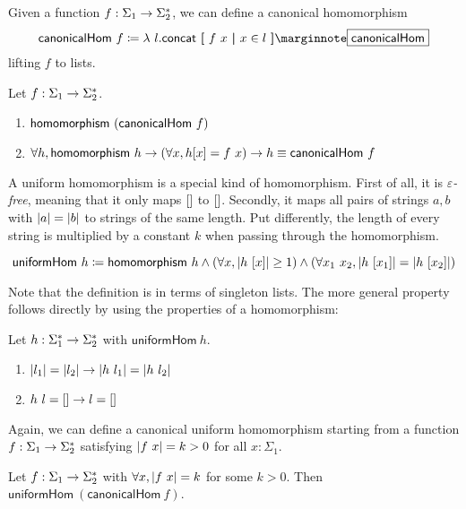 \newcommand{\canonicalHom}{\textsf{canonicalHom}}
Given a function $f : \Sigma_1 \rightarrow \Sigma_2^*$, we can define a canonical homomorphism \[\canonicalHom~f \defeq \lambda~l. \rconcat~\withl f~x \withm x \in l \withr \mnote{\canonicalHom}\]  lifting $f$ to lists.

\begin{proposition}
  Let $f : \Sigma_1 \rightarrow \Sigma_2^*$. 
  \begin{enumerate}
    \item $\homomorphism~(\canonicalHom~f)$
    \item $\forall h, \homomorphism~h \rightarrow (\forall x, h [x] = f~x) \rightarrow h \equiv \canonicalHom~f$
  \end{enumerate}
\end{proposition}

A uniform homomorphism is a special kind of homomorphism. First of all, it is \emph{$\varepsilon$-free}, meaning that it only maps $[]$ to $[]$. Secondly, it maps all pairs of strings $a, b$ with $|a| = |b|$ to strings of the same length. 
Put differently, the length of every string is multiplied by a constant $k$ when passing through the homomorphism. 

\newcommand{\uniformHomo}{\textsf{uniformHom}}
\begin{definition}
  \mnote{\uniformHomo}
  \[\uniformHomo~h \defeq \homomorphism~h \land (\forall x, \length{h~[x]} \ge 1) \land (\forall x_1~x_2, \length{h~[x_1]} = \length{h~[x_2]})\]
\end{definition}
Note that the definition is in terms of singleton lists. The more general property follows directly by using the properties of a homomorphism:
\begin{proposition}
  Let $h : \Sigma_1^* \rightarrow \Sigma_2^*$ with $\uniformHomo~h$.
  \begin{enumerate}
    \item $|l_1| = |l_2| \rightarrow |h~l_1| = |h~l_2|$
    \item $h~l = [] \rightarrow l = []$
  \end{enumerate}
\end{proposition}

Again, we can define a canonical uniform homomorphism starting from a function $f : \Sigma_1 \rightarrow \Sigma_2^*$ satisfying $|f~x| = k > 0$ for all $x : \Sigma_1$. 
\begin{proposition}
  Let $f : \Sigma_1 \rightarrow \Sigma_2^*$ with $\forall x, |f~x| = k$ for some $k > 0$. 
  Then $\uniformHomo~(\canonicalHom~f)$. 
\end{proposition}

